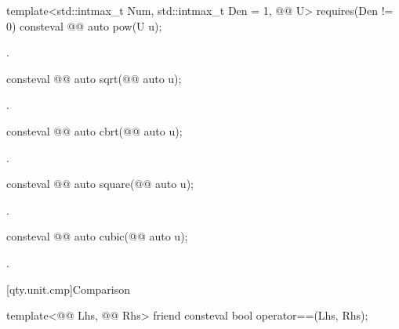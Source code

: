 \begin{itemdecl}
template<std::intmax_t Num, std::intmax_t Den = 1, @@ U>
  requires(Den != 0)
consteval @@ auto pow(U u);
\end{itemdecl}

\begin{itemdescr}
\pnum
\returns
{}.
\end{itemdescr}

\begin{itemdecl}
consteval @@ auto sqrt(@@ auto u);
\end{itemdecl}

\begin{itemdescr}
\pnum
\returns
{}.
\end{itemdescr}

\begin{itemdecl}
consteval @@ auto cbrt(@@ auto u);
\end{itemdecl}

\begin{itemdescr}
\pnum
\returns
{}.
\end{itemdescr}

\begin{itemdecl}
consteval @@ auto square(@@ auto u);
\end{itemdecl}

\begin{itemdescr}
\pnum
\returns
{}.
\end{itemdescr}

\begin{itemdecl}
consteval @@ auto cubic(@@ auto u);
\end{itemdecl}

\begin{itemdescr}
\pnum
\returns
{}.
\end{itemdescr}

[qty.unit.cmp]{Comparison}

\begin{itemdecl}
template<@@ Lhs, @@ Rhs>
friend consteval bool operator==(Lhs, Rhs);
\end{itemdecl}

